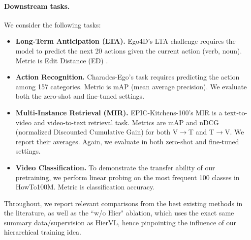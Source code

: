 \documentclass[10pt,twocolumn,letterpaper]{article}
\newcommand{\modelname}[0]{{HierVL}}
\begin{document}
\paragraph{Downstream tasks.} We consider the following tasks:
\begin{itemize}
\item \textbf{Long-Term Anticipation (LTA).} Ego4D's LTA challenge requires the model to predict the next 20 actions given the current action (verb, noun). Metric is Edit Distance (ED) \cite{ego4d}. 

\item \textbf{Action Recognition.} Charades-Ego's task requires predicting the action among 157 categories. Metric is mAP (mean average precision). We evaluate both the zero-shot and fine-tuned settings.

\item \textbf{Multi-Instance Retrieval (MIR).} EPIC-Kitchens-100's MIR is a text-to-video and video-to-text retrieval task. Metrics are mAP and nDCG (normalized Discounted Cumulative Gain) for both V$\rightarrow$T and T$\rightarrow$V. We report their averages. Again, we evaluate in both zero-shot and fine-tuned settings.

\item \textbf{Video Classification.} To demonstrate the transfer ability of our pretraining, we perform linear probing on the most frequent 100 classes in HowTo100M. Metric is classification accuracy.
\end{itemize}

Throughout, we report relevant comparisons from the best existing methods in the literature, as well as the ``w/o Hier" ablation, which uses the exact same summary data/supervision as \modelname, hence pinpointing the influence of our hierarchical training idea. 
\end{document}
